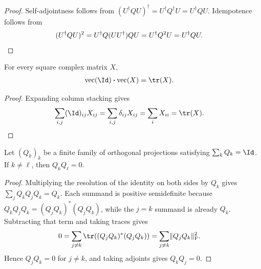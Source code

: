 \begin{proof}\leanok
    Self-adjointness follows from
    $(U^\dagger Q U)^\dagger=U^\dagger Q^\dagger U=U^\dagger Q U$.
    Idempotence follows from
    \begin{align}
        (U^\dagger Q U)^2
         & =U^\dagger Q(UU^\dagger)QU
        =U^\dagger Q^2U
        =U^\dagger Q U.
        \notag
    \end{align}
\end{proof}

\begin{theorem}
    \label{thm:matrix_vec_identity_trace_pairing}
    \leanok
    For every square complex matrix $X$,
    \begin{align}
        \operatorname{vec}(\Id)\mathbin{\boldsymbol\cdot}
            \operatorname{vec}(X)&=\tr(X).
    \end{align}
\end{theorem}

\begin{proof}\leanok
    Expanding column stacking gives
    \begin{align}
        \sum_{i,j}(\Id)_{ij}X_{ij}
        &=\sum_{i,j}\delta_{ij}X_{ij}
         =\sum_iX_{ii}
         =\tr(X).
    \end{align}
\end{proof}

\begin{lemma}
    \label{lem:orthogonal_projection_mul_eq_zero_of_sum_eq_one}
    \leanok
    Let $(Q_k)_k$ be a finite family of orthogonal projections satisfying
    $\sum_k Q_k=\Id$. If $k\ne\ell$, then $Q_kQ_\ell=0$.
\end{lemma}

\begin{proof}\leanok
    Multiplying the resolution of the identity on both sides by $Q_k$ gives
    $\sum_j Q_kQ_jQ_k=Q_k$. Each summand is positive semidefinite because
    $Q_kQ_jQ_k=(Q_jQ_k)^*(Q_jQ_k)$, while the $j=k$ summand is already $Q_k$.
    Subtracting that term and taking traces gives
    \begin{align}
        0
         & =\sum_{j\ne k}\tr((Q_jQ_k)^*(Q_jQ_k))
        =\sum_{j\ne k}\lVert Q_jQ_k\rVert_{\mathrm F}^{2}.
        \notag
    \end{align}
    Hence $Q_jQ_k=0$ for $j\ne k$, and taking adjoints gives $Q_kQ_j=0$.
\end{proof}

